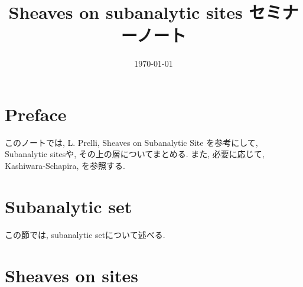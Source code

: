 \documentclass[nomag*,a4paper,leqno,uplatex]{jsarticle}
\title{\vspace{-2.5em}Sheaves on subanalytic sites セミナーノート\vspace{-1em}}
\date{\vspace{-1em}\today\vspace{-1.5em}}
\numberwithin{thm}{subsection}
\numberwithin{equation}{subsection}
\begin{document}
\maketitle
\tableofcontents
\addtocounter{section}{-1}
\section{Preface}
このノートでは,
L. Prelli,
Sheaves on Subanalytic Site \cite{book:Prelli}
を参考にして,
Subanalytic sitesや,
その上の層についてまとめる.
また, 必要に応じて,
Kashiwara-Schapira\cite{book:KS_sh}, \cite{book:KS_cat}
を参照する.

\section{Subanalytic set}
この節では, subanalytic setについて述べる.


\section{Sheaves on sites}




\end{document}

